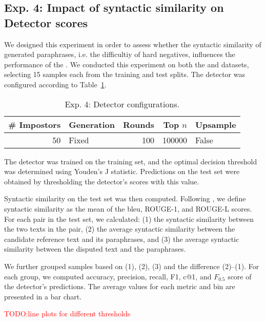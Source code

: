 \subsection{Exp. 4: Impact of syntactic similarity on \imp{} Detector scores}
\label{sec:syn_sim_impact_}

We designed this experiment in order to assess whether the syntactic similarity of generated paraphrases, i.e. the difficultiy of hard negatives, influences the performance of the \impAppr{}.
We conducted this experiment on both the \dataBlog{} and \dataStudent{} datasets, selecting 15 samples each from the training and test splits. 
The detector was configured according to Table~\ref{tab:imp_syn_sim_config}.

\begin{table}[h]
\centering\small
\caption{Exp. 4: Detector configurations.}
\label{tab:imp_syn_sim_config}
\begin{tabular}{@{}rlrrl@{}}   %
\toprule
\# Impostors & Generation & Rounds & Top $n$ & Upsample \\
\midrule
50 & Fixed & 100 & \num{100000} & False \\
\bottomrule
\end{tabular}%
\end{table}

The detector was trained on the training set, and the optimal decision threshold was determined using Youden’s J statistic. 
Predictions on the test set were obtained by thresholding the detector’s scores with this value.

Syntactic similarity on the test set was then computed. 
Following \citet{gohsen_captions_2023}, we define syntactic similarity as the mean of the  \ac{bleu}, ROUGE-1, and ROUGE-L scores. 
For each pair in the test set, we calculated:
(1) the syntactic similarity between the two texts in the pair, (2) the average syntactic similarity between the candidate reference text and its paraphrases, and (3) the average syntactic similarity between the disputed text and the paraphrases.

We further grouped samples based on (1), (2), (3) and the difference (2)–(1). 
For each group, we computed accuracy, precision, recall, F1, c@1, and $F_{0.5}$ score of the detector’s predictions. 
The average values for each metric and bin are presented in a bar chart.

\textcolor{red}{TODO:line plots for different thresholds}
